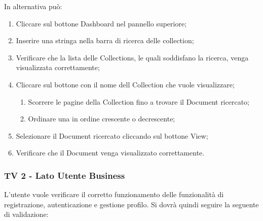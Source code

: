 In alternativa può:
\begin{enumerate}
\item Cliccare sul bottone Dashboard nel pannello superiore;
\item Inserire una stringa nella barra di ricerca delle collection;
\item  Verificare che la lista delle Collections, le quali soddisfano la ricerca, venga visualizzata correttamente;
\item Cliccare sul bottone con il nome dell Collection che vuole visualizzare;
\begin{enumerate}
\item Scorrere le pagine della Collection fino a trovare il Document ricercato;
\item Ordinare una  in ordine crescente o decrescente;
\end{enumerate}
\item Selezionare il Document ricercato cliccando sul bottone View;
\item Verificare che il Document venga visualizzato correttamente.
\end{enumerate}

\subsubsection{TV 2 - Lato Utente Business}
L'utente vuole verificare il corretto funzionamento delle funzionalità di registrazione, autenticazione e gestione profilo.
Si dovrà quindi seguire la seguente  di validazione:

